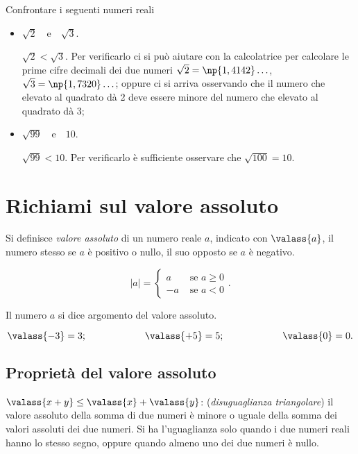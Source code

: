\pagebreak
\begin{exrig}
 \begin{esempio}
 Confrontare i seguenti numeri reali
 \begin{itemize}
 \item $\sqrt{2}$~~e~~$\sqrt{3}$.
 
 $\sqrt{2}<\sqrt{3}$. Per verificarlo ci si può aiutare con la calcolatrice per calcolare le prime cifre decimali dei due numeri $\sqrt{2}=\np{1,4142}\ldots$, $\sqrt{3}=\np{1,7320}\ldots$; oppure ci si arriva osservando che il numero che elevato al quadrato dà 2 deve essere minore del numero che elevato al quadrato dà 3;
 \item $\sqrt{99}$~~e~~$10$.
 
 $\sqrt{99}<10$. Per verificarlo è sufficiente osservare che $\sqrt{100}=10$.
 \end{itemize}
 \end{esempio}
\end{exrig}
\ovalbox{\risolvii \ref{ese:1.3}, \ref{ese:1.4}, \ref{ese:1.5}, \ref{ese:1.6}, \ref{ese:1.7}}\vspazio

\section{Richiami sul valore assoluto}

Si definisce \emph{valore assoluto} di un numero reale $a$, indicato con $\valass{a}$, il numero stesso se $a$ è positivo o nullo, il suo opposto se $a$ è negativo.

\[
|a|=
\begin{cases}
a & \text{ se }a\ge 0\\
-a & \text{ se }a<0
\end{cases}.
\]

Il numero $a$ si dice argomento del valore assoluto.

\[\valass{-3}=3;\qquad\qquad\qquad\valass{+5}=5;\qquad\qquad\qquad\valass{0}=0.\]

\subsection{Proprietà del valore assoluto}

$\valass{x+y}\le \valass{x}+\valass{y}$: (\emph{disuguaglianza triangolare}) il valore assoluto della somma di due numeri è minore o uguale della somma dei valori assoluti dei due numeri. Si ha l'uguaglianza solo quando i due numeri reali hanno lo stesso segno, oppure quando almeno uno dei due numeri è nullo.


